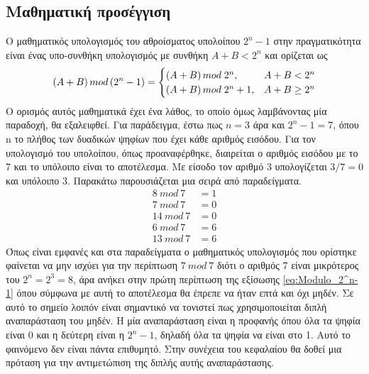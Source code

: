 \subsection{Μαθηματική προσέγγιση}
Ο μαθηματικός υπολογισμός του αθροίσματος υπολοίπου $2^n-1$ στην πραγματικότητα είναι 
ένας υπο-συνθήκη υπολογισμός με συνθήκη $A+B < 2^n$ και ορίζεται ως 
\begin{equation}
\label{eq:Modulo_2^n-1}
\equationame{Ορισμός άθροισης υπολοίπου $2^n-1$}
(A+B)\, mod\, (2^n-1) = 
\begin{cases}
    (A+B)\, mod\; 2^n       , &  A+B < 2^n\\
    (A+B)\, mod\; 2^n + 1   , & A+B \geq 2^n
\end{cases}
\end{equation}
Ο ορισμός αυτός μαθηματικά έχει ένα λάθος, το οποίο όμως λαμβάνοντας μία 
παραδοχή, θα εξαλειφθεί.
Για παράδειγμα, έστω πως $n=3$ άρα και $2^n-1 = 7$, όπου n το πλήθος των δυαδικών ψηφίων
που έχει κάθε αριθμός εισόδου. Για τον υπολογισμό του υπολοίπου, όπως προαναφέρθηκε,
διαιρείται ο αριθμός εισόδου με το 7 και το υπόλοιπο είναι το αποτέλεσμα. Με είσοδο 
τον αριθμό 3 υπολογίζεται $3/7 = 0$ και υπόλοιπο 3. Παρακάτω παρουσιάζεται μια σειρά από 
παραδείγματα.
\begin{equation*}
    \begin{split}
        8\ mod\ 7 &= 1 \\
        7\ mod\ 7 &= 0 \\
        14\ mod\ 7 &= 0 \\
        6\ mod\ 7 &= 6 \\
        13\ mod\ 7 &= 6
    \end{split}
\end{equation*}
Όπως είναι εμφανές και στα παραδείγματα ο μαθηματικός υπολογισμός που ορίστηκε φαίνεται να 
μην ισχύει για την περίπτωση $7\ mod\ 7$ διότι ο αριθμός 7 είναι μικρότερος του $2^n = 2^3 = 8$,
άρα ανήκει στην πρώτη περίπτωση της εξίσωσης \ref{eq:Modulo_2^n-1} όπου σύμφωνα με αυτή το 
αποτέλεσμα θα έπρεπε να ήταν επτά και όχι μηδέν. Σε αυτό το σημείο λοιπόν είναι σημαντικό
να τονιστεί πως χρησιμοποιείται διπλή αναπαράσταση του μηδέν. Η μία αναπαράσταση είναι η 
προφανής όπου όλα τα ψηφία είναι 0 και η δεύτερη είναι η $2^n-1$, δηλαδή όλα τα ψηφία 
να είναι στο 1. Αυτό το φαινόμενο δεν είναι πάντα επιθυμητό. Στην συνέχεια του κεφαλαίου
θα δοθεί μια πρόταση για την αντιμετώπιση της διπλής αυτής αναπαράστασης.

